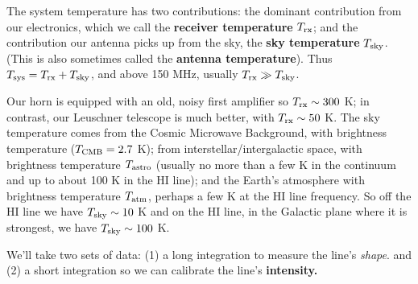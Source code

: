 \documentclass[11pt,preprint]{aastex}
\begin{document}
The system temperature has two contributions: the dominant contribution
  from our electronics, which we call the {\bf receiver temperature} $T_{\rm rx}$;
  and the contribution our antenna picks up from the sky, the {\bf sky temperature}
  $T_{\rm sky}$.  (This is also sometimes called the {\bf antenna temperature}).  
 Thus $T_{\rm sys}= T_{\rm rx} + T_{\rm sky}$, and above 150 MHz, usually $T_{\rm rx} \gg T_{\rm sky}$. 

Our horn is equipped with an old, noisy first amplifier so $T_{\rm rx} \sim
300$ K; in contrast, our Leuschner telescope is much better, with $T_{\rm rx}
\sim 50$ K. The sky temperature comes from the Cosmic Microwave Background,
with brightness temperature ($T_{\rm CMB} = 2.7$ K); from
interstellar/intergalactic space, with brightness temperature
$T_{\rm astro}$ (usually no more than a few K in the continuum and up to
about 100 K in the HI line); and the Earth's atmosphere with brightness
temperature $T_{\rm atm}$, perhaps a few K at the HI line frequency. So
off the HI line we have $T_{\rm sky} \sim 10$ K and on the HI line, in the
Galactic plane where it is strongest, we have $T_{\rm sky} \sim 100$ K.

We'll take two sets of data: (1) a long integration to measure the line's
{\it shape}. and (2) a short integration so we can calibrate the line's
{\bf intensity.}
\end{document}

